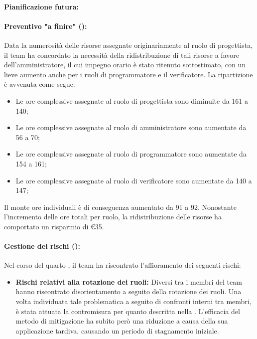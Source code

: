 \paragraph*{Pianificazione futura:}

\paragraph*{Preventivo "a finire" ():}
\par Data la numerosità delle risorse assegnate originariamente al ruolo di progettista, il team ha concordato la necessità della ridistribuzione di tali risorse a favore dell'amministratore, il cui impegno orario è stato ritenuto sottostimato, con un lieve aumento anche per i ruoli di programmatore e il verificatore. 
La ripartizione è avvenuta come segue:
\begin{itemize}
  \item Le ore complessive assegnate al ruolo di progettista sono diminuite da 161 a 140;
  \item Le ore complessive assegnate al ruolo di amministratore sono aumentate da 56 a 70;
  \item Le ore complessive assegnate al ruolo di programmatore sono aumentate da 154 a 161;
  \item Le ore complessive assegnate al ruolo di verificatore sono aumentate da 140 a 147;
\end{itemize}
Il monte ore individuali è di conseguenza aumentato da 91 a 92. Nonostante l'incremento delle ore totali per ruolo, la ridistribuzione delle risorse ha comportato un risparmio di €35.

\paragraph*{Gestione dei rischi ():}
\par Nel corso del quarto , il team ha riscontrato l'affioramento dei seguenti rischi:
\begin{itemize}
  \item \textbf{Rischi relativi alla rotazione dei ruoli:} Diversi tra i membri del team hanno riscontrato disorientamento a seguito della rotazione dei ruoli. Una volta individuata tale problematica a seguito di confronti interni tra membri, è stata attuata la contromisura per quanto descritta nella . L'efficacia del metodo di mitigazione ha subito però una riduzione a causa della sua applicazione tardiva, causando un periodo di stagnamento iniziale.
\end{itemize}